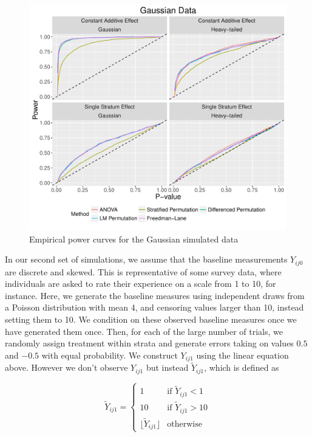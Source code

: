 \documentclass[11pt]{article}
\begin{document}
\begin{figure}
\centering
\includegraphics[width = \textwidth]{fig/normal_simulation_power}
\caption{Empirical power curves for the Gaussian simulated data}
\label{fig:normal_sim_power}
\end{figure}
\begin{center}

\end{center}

In our second set of simulations, we assume that the baseline measurements $Y_{ij0}$ are discrete and skewed.
This is representative of some survey data, where individuals are asked to rate their experience on a scale from 1 to 10, for instance.
Here, we generate the baseline measures using independent draws from a Poisson distribution with mean 4, and censoring values larger than 10, instead setting them to 10.
We condition on these observed baseline measures once we have generated them once.
Then, for each of the large number of trials, we randomly assign treatment within strata and generate errors taking on values $0.5$ and $-0.5$ with equal probability.
We construct $Y_{ij1}$ using the linear equation above.
However we don't observe $Y_{ij1}$ but instead $\tilde{Y}_{ij1}$, which is defined as 

\begin{displaymath}
   \tilde{Y}_{ij1} = \left\{
     \begin{array}{ll}
       1 & \text{if } \tilde{Y}_{ij1} < 1\\
       10 & \text{if } \tilde{Y}_{ij1} > 10 \\
       \lfloor \tilde{Y}_{ij1} \rfloor & \text{otherwise}
     \end{array}
   \right.
\end{displaymath}
\end{document}
